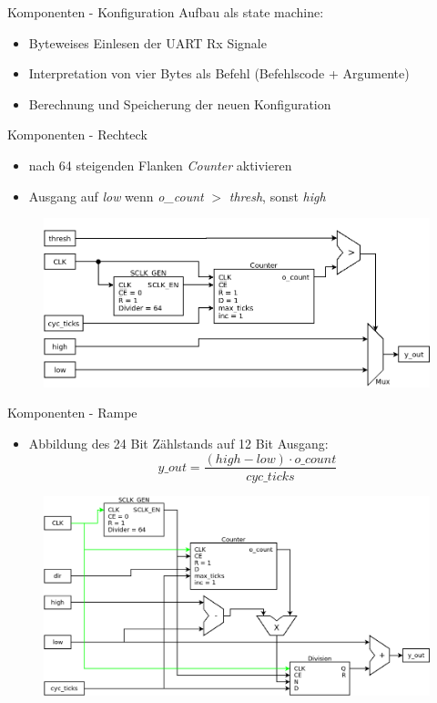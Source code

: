 \documentclass[11pt]{beamer}
\begin{document}
\begin{frame}{Komponenten - Konfiguration}
    Aufbau als state machine:
      \begin{itemize}
        \item Byteweises Einlesen der UART Rx Signale 
        \item Interpretation von vier Bytes als Befehl (Befehlscode + Argumente) 
        \item Berechnung und Speicherung der neuen Konfiguration
      \end{itemize}
      \resizebox{\textwidth}{!}{
        
      }
\end{frame}

\begin{frame}{Komponenten - Rechteck}
  \begin{itemize}
    \item nach 64 steigenden Flanken \emph{Counter} aktivieren
    \item Ausgang auf \emph{low} wenn \emph{o\_count} $>$ \emph{thresh}, sonst \emph{high} 
  \end{itemize}
  \begin{figure}
    \includegraphics[scale=0.32]{square}
  \end{figure}
\end{frame}

\begin{frame}{Komponenten - Rampe}
  \begin{itemize}
  \item Abbildung des 24 Bit Zählstands auf 12 Bit Ausgang:
    $$ y\_out = \frac{(high - low) \cdot o\_count}{cyc\_ticks} $$
  \end{itemize}
  \begin{figure}
    \includegraphics[scale=0.28]{ramp}
  \end{figure}
\end{frame}
\end{document}
